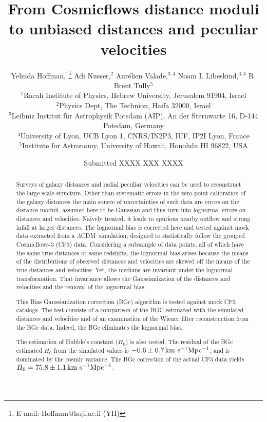\documentclass[useAMS,usenatbib]{mn2e}
\title
[From Cosmicflows  distance moduli to unbiased  distances and velocities]
{From Cosmicflows  distance moduli to unbiased  distances and peculiar velocities %
}
\author[Y. Hoffman et al.]{
Yehuda Hoffman,$^{1}$\thanks{E-mail: Hoffman@huji.ac.il (YH)}
Adi Nusser,$^{2}$
Aur\'elien Valade,$^{3,4}$
Noam I. Libeskind,$^{3,4}$
R.  Brent Tully$^{5}$
\\
$^{1}$Racah Institute of Physics, Hebrew University, Jerusalem 91904, Israel\\
$^{2}$Physics Dept, The Technion, Haifa 32000, Israel\\
$^{3}$Leibniz Institut f\"ur Astrophysik Potsdam (AIP), An der Sternwarte 16, D-144 Potsdam, Germany\\
$^{4}$University of Lyon, UCB Lyon 1, CNRS/IN2P3, IUF, IP2I Lyon, France\\
$^{5}$Institute for Astronomy, University of Hawaii, Honolulu HI 96822, USA
}
\newcommand{\kmsMpc}{{\,\rm km \ s^{-1}Mpc^{-1}}}
\newcommand{\LCDM}{{$\Lambda$CDM}}
\begin{document}
\date{Submitted XXXX XXX XXXX}

\pagerange{\pageref{firstpage}--\pageref{lastpage}} 

\maketitle

\label{firstpage}



\begin{abstract}
Surveys of galaxy  distances  and  radial peculiar velocities can be used to reconstruct the large scale   structure. Other than systematic errors in the zero-point calibration of the galaxy distances the main source  of   uncertainties   of such data are errors on the distance moduli, assumed here to be Gaussian and thus turn  into lognormal errors on distances and velocities. Naively treated,  it  leads to  spurious nearby outflow   and strong infall at larger distances. The lognormal bias is corrected here  and   tested against mock data   extracted from a \LCDM\ simulation, designed to statistically follow the grouped Cosmicflows-3  (CF3) data.  Considering  a subsample of data points, all of  which have the same true distances or same redshifts,  the lognormal bias arises because the means of the distributions of observed distances and velocities are skewed off the means  of the true distances and velocities. Yet, the medians are invariant under the lognormal transformation. That  invariance   allows the Gaussianization of the distances and velocities and the removal of the lognormal bias. 

This  Bias   Gaussianization correction (BGc) algorithm is tested against   mock CF3 catalogs. The test consists of a comparison   of the BGC estimated  with the simulated distances and velocities and of an examination of the Wiener filter reconstruction from the BGc data. Indeed, the BGc eliminates the lognormal bias.



The estimation of Hubble's constant ($H_0$) is also tested. The  residual of the BGc estimated $H_0$ from the simulated  values  is $-0.6\pm0.7\kmsMpc$, and is dominated by the cosmic variance. The  BGc correction of the actual CF3 data yields $H_0=75.8\pm1.1\kmsMpc$.


\end{abstract}
\end{document}
